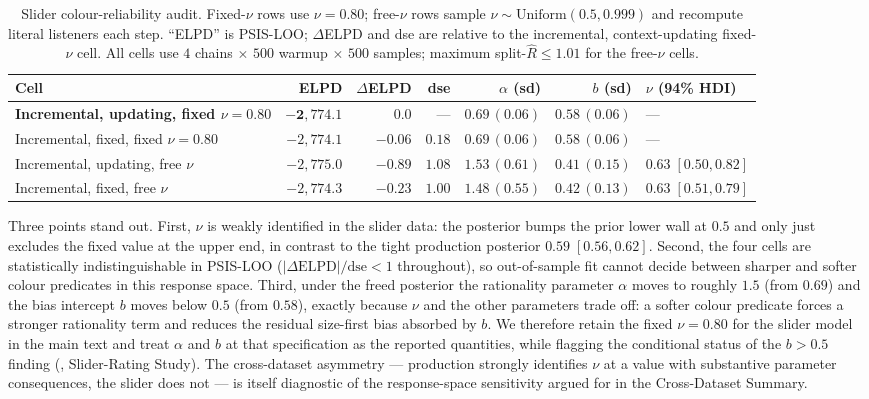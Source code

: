 \documentclass[man,floatsintext]{apa7}
\begin{document}
\begin{table}[htbp]
\centering
\caption{Slider colour-reliability audit. Fixed-$\nu$ rows use $\nu = 0.80$; free-$\nu$ rows sample $\nu \sim \mathrm{Uniform}(0.5, 0.999)$ and recompute literal listeners each step. ``ELPD'' is PSIS-LOO; $\Delta$ELPD and dse are relative to the incremental, context-updating fixed-$\nu$ cell. All cells use $4$ chains $\times$ $500$ warmup $\times$ $500$ samples; maximum split-$\hat R \leq 1.01$ for the free-$\nu$ cells.}
\label{tab:slider-nu-audit}
\footnotesize
\begin{tabular}{p{4.2cm}rrrrrl}
\hline
Cell & ELPD & $\Delta$ELPD & dse & $\alpha$ (sd) & $b$ (sd) & $\nu$ (94\% HDI) \\
\hline
\textbf{Incremental, updating, fixed $\nu = 0.80$} & $\mathbf{-2{,}774.1}$ & $\mathbf{0.0}$ & --- & $\mathbf{0.69\,(0.06)}$ & $\mathbf{0.58\,(0.06)}$ & --- \\
Incremental, fixed, fixed $\nu = 0.80$ & $-2{,}774.1$ & $-0.06$ & $0.18$ & $0.69\,(0.06)$ & $0.58\,(0.06)$ & --- \\
Incremental, updating, free $\nu$ & $-2{,}775.0$ & $-0.89$ & $1.08$ & $1.53\,(0.61)$ & $0.41\,(0.15)$ & $0.63\;[0.50, 0.82]$ \\
Incremental, fixed, free $\nu$ & $-2{,}774.3$ & $-0.23$ & $1.00$ & $1.48\,(0.55)$ & $0.42\,(0.13)$ & $0.63\;[0.51, 0.79]$ \\
\hline
\end{tabular}
\end{table}

Three points stand out.
First, $\nu$ is weakly identified in the slider data: the posterior bumps the prior lower wall at $0.5$ and only just excludes the fixed value at the upper end, in contrast to the tight production posterior $0.59\;[0.56, 0.62]$.
Second, the four cells are statistically indistinguishable in PSIS-LOO ($|\Delta\text{ELPD}|/\text{dse} < 1$ throughout), so out-of-sample fit cannot decide between sharper and softer colour predicates in this response space.
Third, under the freed posterior the rationality parameter $\alpha$ moves to roughly $1.5$ (from $0.69$) and the bias intercept $b$ moves below $0.5$ (from $0.58$), exactly because $\nu$ and the other parameters trade off: a softer colour predicate forces a stronger rationality term and reduces the residual size-first bias absorbed by $b$.
We therefore retain the fixed $\nu = 0.80$ for the slider model in the main text and treat $\alpha$ and $b$ at that specification as the reported quantities, while flagging the conditional status of the $b > 0.5$ finding (, Slider-Rating Study).
The cross-dataset asymmetry --- production strongly identifies $\nu$ at a value with substantive parameter consequences, the slider does not --- is itself diagnostic of the response-space sensitivity argued for in the Cross-Dataset Summary.
\end{document}
